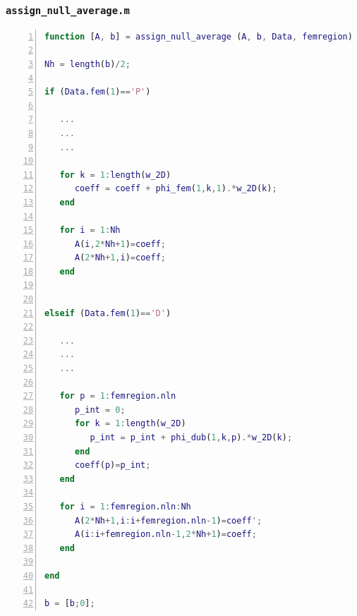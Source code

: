 \documentclass[a4paper,11pt]{article}
\begin{document}
\subsubsection{\texttt{assign\_null\_average.m}}\label{mean}
\begin{lstlisting}[language=Matlab,basicstyle=\small, numbers=left, numberstyle=\tiny,  name = assign_null_average.m, frame=single]
function [A, b] = assign_null_average (A, b, Data, femregion)

Nh = length(b)/2;

if (Data.fem(1)=='P')

   ...
   ...
   ...

   for k = 1:length(w_2D)
      coeff = coeff + phi_fem(1,k,1).*w_2D(k);
   end

   for i = 1:Nh
      A(i,2*Nh+1)=coeff;
      A(2*Nh+1,i)=coeff;
   end


elseif (Data.fem(1)=='D')

   ...
   ...
   ...

   for p = 1:femregion.nln
      p_int = 0;
      for k = 1:length(w_2D)
         p_int = p_int + phi_dub(1,k,p).*w_2D(k);
      end
      coeff(p)=p_int;
   end

   for i = 1:femregion.nln:Nh
      A(2*Nh+1,i:i+femregion.nln-1)=coeff';
      A(i:i+femregion.nln-1,2*Nh+1)=coeff;
   end

end

b = [b;0];

\end{lstlisting}
    \newpage ~\newpage
    \printbibliography
\end{document}
